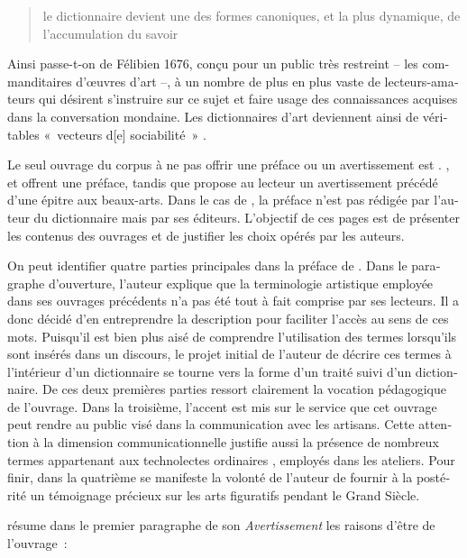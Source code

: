 \documentclass[output=paper,colorlinks,citecolor=brown,arabicfont,chinesefont,booklanguage=french]{langscibook}
\begin{document}
\begin{otherlanguage}{french}
\begin{quote}
    le dictionnaire devient une des formes canoniques, et la plus dynamique, de l’accumulation du savoir
\end{quote}

Ainsi passe-t-on de Félibien 1676, conçu pour un public très restreint – les commanditaires d’œuvres d’art \citep[178]{Maes2016} –, à un nombre de plus en plus vaste de lecteurs-amateurs qui désirent s’instruire sur ce sujet et faire usage des connaissances acquises dans la conversation mondaine. Les dictionnaires d’art deviennent ainsi de véritables «~vecteurs d[e] sociabilité~» \citep[182]{Maes2016}.

Le seul ouvrage du corpus à ne pas offrir une préface ou un avertissement est \citet{Marsy1746}. \citet{Felibien1676}, \citet{Pernety1757} et \citet{Boutard1826} offrent une préface, tandis que \citet{Lacombe1752} propose au lecteur un avertissement précédé d’une épitre aux beaux-arts. Dans le cas de \citep{Boutard1826}, la préface n’est pas rédigée par l’auteur du dictionnaire mais par ses éditeurs. L’objectif de ces pages est de présenter les contenus des ouvrages et de justifier les choix opérés par les auteurs.

On peut identifier quatre parties principales dans la préface de \citet{Felibien1676}. Dans le paragraphe d’ouverture, l’auteur explique que la terminologie artistique employée dans ses ouvrages précédents n’a pas été tout à fait comprise par ses lecteurs. Il a donc décidé d’en entreprendre la description pour faciliter l’accès au sens de ces mots. Puisqu’il est bien plus aisé de comprendre l’utilisation des termes lorsqu’ils sont insérés dans un discours, le projet initial de l’auteur de décrire ces termes à l’intérieur d’un dictionnaire se tourne vers la forme d’un traité suivi d’un dictionnaire. De ces deux premières parties ressort clairement la vocation pédagogique de l’ouvrage. Dans la troisième, l’accent est mis sur le service que cet ouvrage peut rendre au public visé dans la communication avec les artisans. Cette attention à la dimension communicationnelle justifie aussi la présence de nombreux termes appartenant aux technolectes ordinaires \citep{Messaoudi2013}, employés dans les ateliers. Pour finir, dans la quatrième se manifeste la volonté de l’auteur de fournir à la postérité un témoignage précieux sur les arts figuratifs pendant le Grand Siècle.

\citet{Lacombe1752} résume dans le premier paragraphe de son \emph{Avertissement} les raisons d’être de l’ouvrage~:


\end{otherlanguage}
\end{document}
